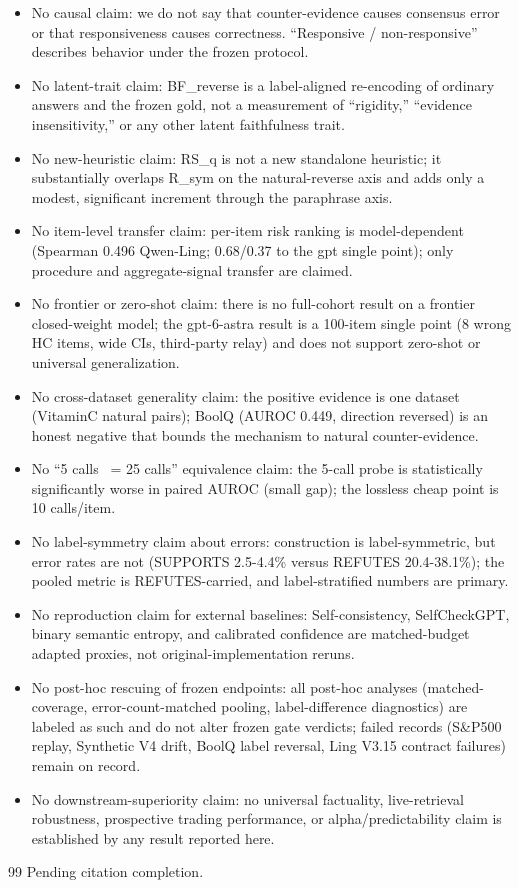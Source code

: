 \documentclass[11pt]{article}
\begin{document}
\begin{itemize}
  \item No causal claim: we do not say that counter-evidence causes consensus error or that responsiveness causes correctness. “Responsive / non-responsive” describes behavior under the frozen protocol.
  \item No latent-trait claim: BF\_reverse is a label-aligned re-encoding of ordinary answers and the frozen gold, not a measurement of “rigidity,” “evidence insensitivity,” or any other latent faithfulness trait.
  \item No new-heuristic claim: RS\_q is not a new standalone heuristic; it substantially overlaps R\_sym on the natural-reverse axis and adds only a modest, significant increment through the paraphrase axis.
  \item No item-level transfer claim: per-item risk ranking is model-dependent (Spearman 0.496 Qwen-Ling; 0.68/0.37 to the gpt single point); only procedure and aggregate-signal transfer are claimed.
  \item No frontier or zero-shot claim: there is no full-cohort result on a frontier closed-weight model; the gpt-6-astra result is a 100-item single point (8 wrong HC items, wide CIs, third-party relay) and does not support zero-shot or universal generalization.
  \item No cross-dataset generality claim: the positive evidence is one dataset (VitaminC natural pairs); BoolQ (AUROC 0.449, direction reversed) is an honest negative that bounds the mechanism to natural counter-evidence.
  \item No “5 calls ~= 25 calls” equivalence claim: the 5-call probe is statistically significantly worse in paired AUROC (small gap); the lossless cheap point is 10 calls/item.
  \item No label-symmetry claim about errors: construction is label-symmetric, but error rates are not (SUPPORTS 2.5-4.4\% versus REFUTES 20.4-38.1\%); the pooled metric is REFUTES-carried, and label-stratified numbers are primary.
  \item No reproduction claim for external baselines: Self-consistency, SelfCheckGPT, binary semantic entropy, and calibrated confidence are matched-budget adapted proxies, not original-implementation reruns.
  \item No post-hoc rescuing of frozen endpoints: all post-hoc analyses (matched-coverage, error-count-matched pooling, label-difference diagnostics) are labeled as such and do not alter frozen gate verdicts; failed records (S\&P500 replay, Synthetic V4 drift, BoolQ label reversal, Ling V3.15 contract failures) remain on record.
  \item No downstream-superiority claim: no universal factuality, live-retrieval robustness, prospective trading performance, or alpha/predictability claim is established by any result reported here.
\end{itemize}

\begin{thebibliography}{99}
 Pending citation completion.
\end{thebibliography}
\end{document}
